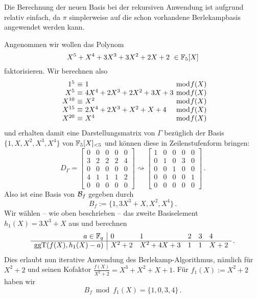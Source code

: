
Die Berechnung der neuen Basis bei der rekursiven Anwendung ist aufgrund
 relativ einfach, da $\pi$ simplerweise auf die schon
vorhandene Berlekampbasis angewendet werden kann.

\begin{beispiel}
  Angenommen wir wollen das Polynom
  \[ X^5 + X^4 + 3 X^3 + 3 X^2 + 2 X + 2 \ \in \mathbb{F}_5[X]\]
  faktorisieren. Wir berechnen also
  \[ \begin{array}{r@{\ \equiv\ }l@{\ \bmod f(X)}}
    1^5 & 1\\
    X^5 & 4X^4 + 2X^3 + 2 X^2+ 3X + 3\\
    X^{10} & X^2\\
    X^{15} & 2X^4 + 2X^3 + X^2 + X + 4\\
    X^{20} & X^4
  \end{array} \]
  und erhalten damit eine Darstellungsmatrix von $\Gamma$ bezüglich der Basis
  $\{ 1, X, X^2, X^3, X^4\}$ von $\mathbb{F}_5[X]_{<5}$ und können diese in
  Zeilenstufenform bringen:
  \[ D_\Gamma = \begin{bmatrix}
      0& 0& 0& 0& 0\\
      3& 2& 2& 2& 4\\
      0& 0& 0& 0& 0\\
      4& 1& 1& 1& 2\\
      0& 0& 0& 0& 0\end{bmatrix} \rightsquigarrow
      \begin{bmatrix}
      1& 0& 0& 0& 0\\
      0& 1& 0& 3& 0\\
      0& 0& 1& 0& 0\\
      0& 0& 0& 0& 1\\
      0& 0& 0& 0& 0\end{bmatrix}\,. \]
  Also ist eine Basis von $\mathcal{B}_f$ gegeben durch
  \[ B_f := \{ 1, 3X^3 +X, X^2, X^4\}\,.\]
  Wir wählen -- wie oben beschrieben -- das zweite Basiselement $h_1(X) = 3X^3 +X$
  aus und berechnen
  \[ \begin{array}{r|lllll}
      a\in \mathbb{F}_q & 0 & 1 & 2 & 3 & 4 \\\hline
      \operatorname{ggT}(f(X), h_1(X)-a) & X^2+2 & X^2+4X+3 & 1 & 1 & X+2\end{array}\,.\]
  Dies erlaubt nun iterative Anwendung des Berlekamp-Algorithmus, nämlich für 
  $X^2+2$ und seinen Kofaktor $\tfrac{f(X)}{X^2+2} = X^3+X^2+X+1$.
  Für $f_1(X) := X^2+2$ haben wir
  \[ B_f \bmod f_1(X) = \{ 1, 0, 3, 4\}\,.\]

\end{beispiel}
